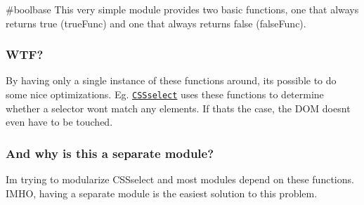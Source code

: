 \#boolbase This very simple module provides two basic functions, one that always returns true ({\ttfamily true\+Func}) and one that always returns false ({\ttfamily false\+Func}).

\subsubsection*{W\+TF?}

By having only a single instance of these functions around, it\textquotesingle{}s possible to do some nice optimizations. Eg. \href{https://github.com/fb55/CSSselect}{\tt {\ttfamily C\+S\+Sselect}} uses these functions to determine whether a selector won\textquotesingle{}t match any elements. If that\textquotesingle{}s the case, the D\+OM doesn\textquotesingle{}t even have to be touched.

\subsubsection*{And why is this a separate module?}

I\textquotesingle{}m trying to modularize {\ttfamily C\+S\+Sselect} and most modules depend on these functions. I\+M\+HO, having a separate module is the easiest solution to this problem. 